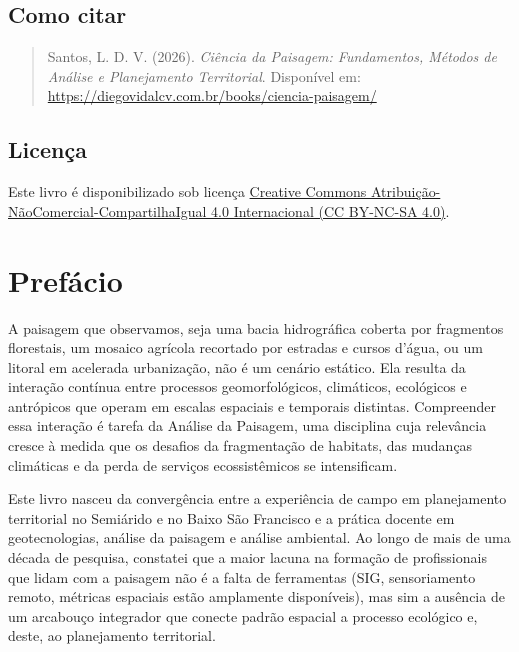 \documentclass[
  portuguese,
  11pt,
  a4paper,
  open=any]{scrbook}
\begin{document}
\section*{Como citar}\label{como-citar}


\begin{quote}
Santos, L. D. V. (2026). \emph{Ciência da Paisagem: Fundamentos, Métodos
de Análise e Planejamento Territorial}. Disponível em:
\url{https://diegovidalcv.com.br/books/ciencia-paisagem/}
\end{quote}

\section*{Licença}\label{licenuxe7a}


Este livro é disponibilizado sob licença
\href{https://creativecommons.org/licenses/by-nc-sa/4.0/}{Creative
Commons Atribuição-NãoComercial-CompartilhaIgual 4.0 Internacional (CC
BY-NC-SA 4.0)}.


\chapter*{Prefácio}\label{prefuxe1cio}


A paisagem que observamos, seja uma bacia hidrográfica coberta por
fragmentos florestais, um mosaico agrícola recortado por estradas e
cursos d'água, ou um litoral em acelerada urbanização, não é um cenário
estático. Ela resulta da interação contínua entre processos
geomorfológicos, climáticos, ecológicos e antrópicos que operam em
escalas espaciais e temporais distintas. Compreender essa interação é
tarefa da Análise da Paisagem, uma disciplina cuja relevância cresce à
medida que os desafios da fragmentação de habitats, das mudanças
climáticas e da perda de serviços ecossistêmicos se intensificam.

Este livro nasceu da convergência entre a experiência de campo em
planejamento territorial no Semiárido e no Baixo São Francisco e a
prática docente em geotecnologias, análise da paisagem e análise
ambiental. Ao longo de mais de uma década de pesquisa, constatei que a
maior lacuna na formação de profissionais que lidam com a paisagem não é
a falta de ferramentas (SIG, sensoriamento remoto, métricas espaciais
estão amplamente disponíveis), mas sim a ausência de um arcabouço
integrador que conecte padrão espacial a processo ecológico e, deste, ao
planejamento territorial.
\end{document}
